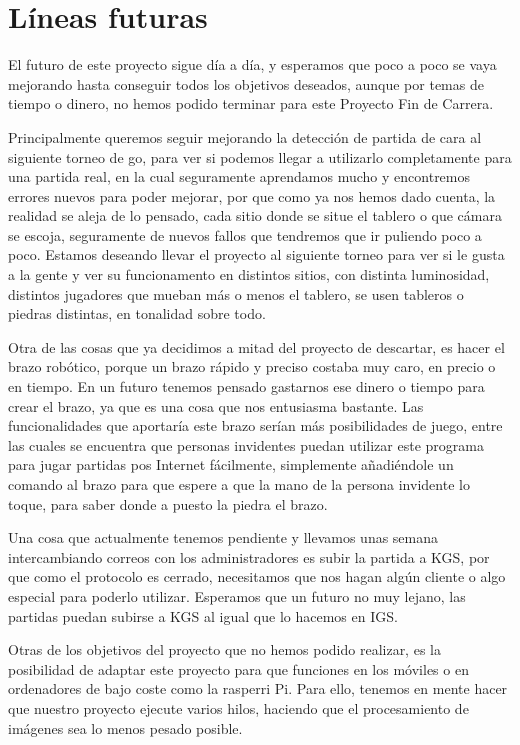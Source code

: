 \documentclass[12pt,a4paper]{report}
\begin{document}
\chapter{Líneas futuras}

El futuro de este proyecto sigue día a día, y esperamos que poco a poco se vaya
mejorando hasta conseguir todos los objetivos deseados, aunque por temas de
tiempo o dinero, no hemos podido terminar para este Proyecto Fin de Carrera. 

Principalmente queremos seguir mejorando la detección de partida de cara al
siguiente torneo de go, para ver si podemos llegar a utilizarlo completamente
para una partida real, en la cual seguramente aprendamos mucho y encontremos
errores nuevos para poder mejorar, por que como ya nos hemos dado cuenta, la
realidad se aleja de lo pensado, cada sitio donde se situe el tablero o que
cámara se escoja, seguramente de nuevos fallos que tendremos que ir puliendo
poco a poco. Estamos deseando llevar el proyecto al siguiente torneo para ver si
le gusta a la gente y ver su funcionamento en distintos sitios, con distinta
luminosidad, distintos jugadores que mueban más o menos el tablero, se usen
tableros o piedras distintas, en tonalidad sobre todo. 

Otra de las cosas que ya decidimos a mitad del proyecto de descartar, es hacer
el brazo robótico, porque un brazo rápido y preciso costaba muy caro, en precio
o en tiempo. En un futuro tenemos pensado gastarnos ese dinero o tiempo para
crear el brazo, ya que es una cosa que nos entusiasma bastante. Las
funcionalidades que aportaría este brazo serían más posibilidades de juego,
entre las cuales se encuentra que personas invidentes puedan utilizar este
programa para jugar partidas pos Internet fácilmente, simplemente añadiéndole un
comando al brazo para que espere a que la mano de la persona invidente lo toque,
para saber donde a puesto la piedra el brazo. 

Una cosa que actualmente tenemos pendiente y llevamos unas semana intercambiando
correos con los administradores es subir la partida a KGS, por que como el
protocolo es cerrado, necesitamos que nos hagan algún cliente o algo especial
para poderlo utilizar. Esperamos que un futuro no muy lejano, las partidas
puedan subirse a KGS al igual que lo hacemos en IGS. 

Otras de los objetivos del proyecto que no hemos podido realizar, es la
posibilidad de adaptar este proyecto para que funciones en los móviles o en
ordenadores de bajo coste como la rasperri Pi. Para ello, tenemos en mente hacer
que nuestro proyecto ejecute varios hilos, haciendo que el procesamiento de
imágenes sea lo menos pesado posible.
\end{document}

